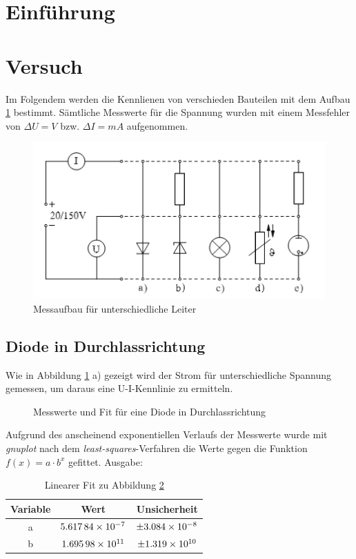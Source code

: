\section{Einführung}
\section{Versuch}
Im Folgendem werden die Kennlienen von verschieden Bauteilen mit dem Aufbau \ref{fig:aufbau} bestimmt. Sämtliche Messwerte für die Spannung wurden mit einem Messfehler von $\Delta U = V$ bzw. $\Delta I = mA$ aufgenommen.
\begin{figure}[H]
	\centering
	\includegraphics[width=.8\textwidth]{Aufbau.png}
	\caption{Messaufbau für unterschiedliche Leiter}
	\label{fig:aufbau}
\end{figure}
\subsection{Diode in Durchlassrichtung}
Wie in Abbildung \ref{fig:aufbau} a) gezeigt wird der Strom für unterschiedliche Spannung gemessen, um daraus eine U-I-Kennlinie zu ermitteln.

\begin{figure}[H]
\centering
{}
\caption{Messwerte und Fit für eine Diode in Durchlassrichtung}
\label{fig:diode}
\end{figure}
Aufgrund des anscheinend exponentiellen Verlaufs der Messwerte wurde mit \emph{gnuplot} nach dem \emph{least-squares}-Verfahren die Werte gegen die Funktion $f(x)=a\cdot b^x$ gefittet. Ausgabe:
\begin{table}[H]
  \centering
  \begin{tabular}{c | c | c }
    Variable  & Wert & Unsicherheit\\ \hline
    a & $\num{5.61784d-7}$ & $\pm\num{3.084d-8}$ \\
    b & $\num{1.69598d+11}$ & $\pm\num{1.319d+10}$
  \end{tabular}
  \caption{Linearer Fit zu Abbildung \ref{fig:diode}}
  \label{tab:fitdiode}
\end{table}
